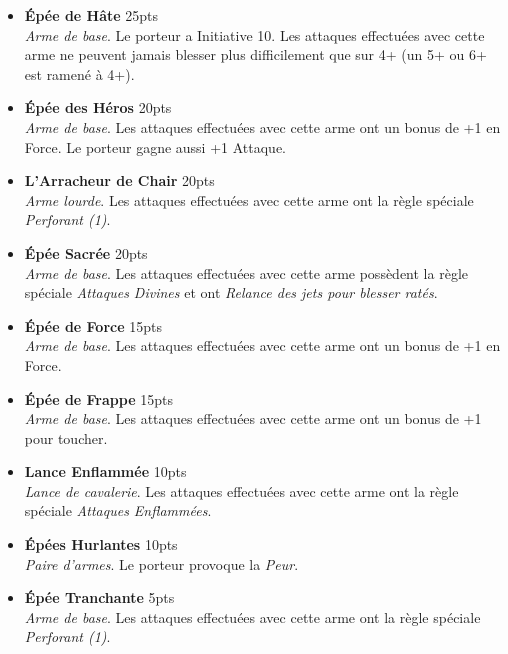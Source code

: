 \begin{multicols}{2}
\begin{itemize}[label={-}]
\item \textbf{Épée de Hâte} \dotfill \unit{25}{pts} \\
\textit{Arme de base}. Le porteur a Initiative 10. Les attaques effectuées avec cette arme ne peuvent jamais blesser plus difficilement que sur 4+ (un 5+ ou 6+ est ramené à 4+).

\item \textbf{Épée des Héros} \dotfill \unit{20}{pts} \\
\textit{Arme de base}. Les attaques effectuées avec cette arme ont un bonus de +1 en Force. Le porteur gagne aussi +1 Attaque. 

\item \textbf{L'Arracheur de Chair} \dotfill \unit{20}{pts} \\
\textit{Arme lourde}. Les attaques effectuées avec cette arme ont la règle spéciale \emph{Perforant (1)}.

\item \textbf{Épée Sacrée} \dotfill \unit{20}{pts} \\
\textit{Arme de base}. Les attaques effectuées avec cette arme possèdent la règle spéciale \emph{Attaques Divines} et ont \emph{Relance des jets pour blesser ratés}.

\item \textbf{Épée de Force} \dotfill \unit{15}{pts} \\
\textit{Arme de base}. Les attaques effectuées avec cette arme ont un bonus de +1 en Force.

\item \textbf{Épée de Frappe} \dotfill \unit{15}{pts} \\
\textit{Arme de base}. Les attaques effectuées avec cette arme ont un bonus de +1 pour toucher.

\item \textbf{Lance Enflammée} \dotfill \unit{10}{pts} \\
\textit{Lance de cavalerie}. Les attaques effectuées avec cette arme ont la règle spéciale \emph{Attaques Enflammées}.

\item \textbf{Épées Hurlantes} \dotfill \unit{10}{pts} \\
\textit{Paire d'armes}. Le porteur provoque la \emph{Peur}.

\item \textbf{Épée Tranchante} \dotfill \unit{5}{pts} \\
\textit{Arme de base}. Les attaques effectuées avec cette arme ont la règle spéciale \emph{Perforant (1)}.

\end{itemize}
\end{multicols}

